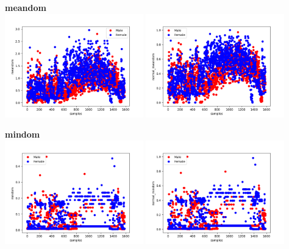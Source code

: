 \documentclass[12pt]{article}
\begin{document}
\begin{justify}
			\textbf{meandom}\\
			    \includegraphics[width=6cm]{../Graphs2/meandom}
				\includegraphics[width=6cm]{../Graphs2/norm_meandom}
				
			\textbf{mindom}\\
				\includegraphics[width=6cm]{../Graphs2/mindom}
				\includegraphics[width=6cm]{../Graphs2/norm_mindom}
				

\end{justify}
\end{document}
